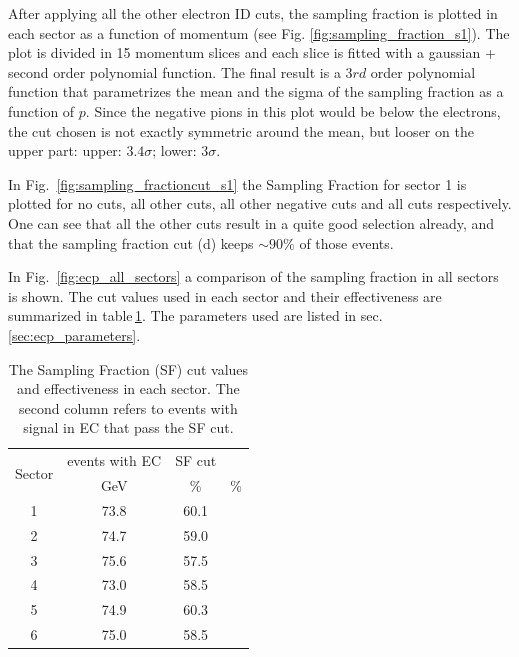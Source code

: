 After applying all the other electron ID cuts, the sampling fraction is plotted in each sector
as a function of momentum (see Fig. \ref{fig:sampling_fraction_s1}). 
The plot is divided in 15 momentum slices
and each slice is fitted with a gaussian + second order polynomial function. The final result
is a $3rd$ order polynomial function that parametrizes the mean and the sigma of the 
sampling fraction as a function of $p$.
Since the negative pions in this plot would be below the electrons, the cut chosen is not exactly
symmetric around the mean, but looser on the upper part: upper: $3.4\sigma$; lower: $3\sigma$.

In Fig.~\ref{fig:sampling_fractioncut_s1} the Sampling Fraction for sector 1 is plotted for
no cuts, all other cuts, all other negative cuts and all cuts respectively. One can see 
that all the other cuts result in a quite good selection already, and that the sampling 
fraction cut (d) keeps  $\sim 90\%$ of those events.

In Fig.~\ref{fig:ecp_all_sectors} a comparison of the sampling fraction in all sectors is shown.
The cut values used in each sector and their effectiveness are summarized in 
table\,\ref{tab:sfcut}. The parameters used are listed in sec.\ref{sec:ecp_parameters}.

\vspace{0.1cm}
\begin{table}[h]
\label{tab:sfcut}
	\begin{center}
		\begin{tabular}{c | c | c | c}
			\hline 
			\multirow{2}{*}{Sector} 
					& events with EC & SF cut\\
					&  GeV & \% & \% \\
			\hline
			1   & 73.8 & 60.1 \\
			2   & 74.7 & 59.0 \\
			3   & 75.6 & 57.5 \\
			4   & 73.0 & 58.5 \\
			5   & 74.9 & 60.3 \\
			6   & 75.0 & 58.5 \\
			\hline 
		\end{tabular}
		\caption{The Sampling Fraction (SF) cut values and effectiveness in each sector.
					The second column refers to events with signal in EC that pass the SF cut.}	
	\end{center}
\end{table}



